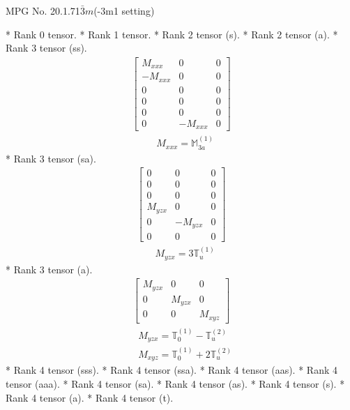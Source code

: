 \documentclass[fleqn,8pt,landscape]{jsarticle}
\begin{document}
\setcounter{MaxMatrixCols}{32}

\renewcommand{\tablename}{Table~}
\renewcommand{\figurename}{Figure~}
\begin{center}
\LARGE
MPG No. 20.1.71\quad$\bar{3}m$\quad(-3m1 setting)
\end{center}
* Rank 0 tensor.
* Rank 1 tensor.
* Rank 2 tensor (s).
* Rank 2 tensor (a).
* Rank 3 tensor (ss).
\begin{align*}
\begin{bmatrix} M_{xxx} & 0 & 0 \\ - M_{xxx} & 0 & 0 \\ 0 & 0 & 0 \\ 0 & 0 & 0 \\ 0 & 0 & 0 \\ 0 & - M_{xxx} & 0 \end{bmatrix}
\end{align*}
\begin{align*}
& M_{xxx} = \mathbb{M}_{3a}^{(1)}
\end{align*}
* Rank 3 tensor (sa).
\begin{align*}
\begin{bmatrix} 0 & 0 & 0 \\ 0 & 0 & 0 \\ 0 & 0 & 0 \\ M_{yzx} & 0 & 0 \\ 0 & - M_{yzx} & 0 \\ 0 & 0 & 0 \end{bmatrix}
\end{align*}
\begin{align*}
& M_{yzx} = 3 \mathbb{T}_{u}^{(1)}
\end{align*}
* Rank 3 tensor (a).
\begin{align*}
\begin{bmatrix} M_{yzx} & 0 & 0 \\ 0 & M_{yzx} & 0 \\ 0 & 0 & M_{xyz} \end{bmatrix}
\end{align*}
\begin{align*}
& M_{yzx} = \mathbb{T}_{0}^{(1)} - \mathbb{T}_{u}^{(2)} \\
& M_{xyz} = \mathbb{T}_{0}^{(1)} + 2 \mathbb{T}_{u}^{(2)}
\end{align*}
* Rank 4 tensor (sss).
* Rank 4 tensor (ssa).
* Rank 4 tensor (aas).
* Rank 4 tensor (aaa).
* Rank 4 tensor (sa).
* Rank 4 tensor (as).
* Rank 4 tensor (s).
* Rank 4 tensor (a).
* Rank 4 tensor (t).
\end{document}
